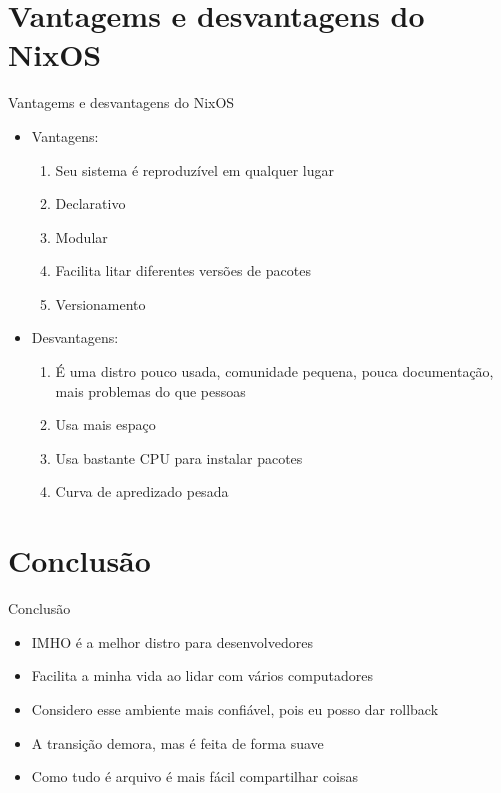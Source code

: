 \documentclass[presentation]{beamer}
\begin{document}
\section{Vantagems e desvantagens do NixOS}
\label{sec:orga81393d}
\begin{frame}[label={sec:org8da6f29}]{Vantagems e desvantagens do NixOS}
\begin{itemize}
\item Vantagens:
\begin{enumerate}
\item Seu sistema é reproduzível em qualquer lugar
\item Declarativo
\item Modular
\item Facilita litar diferentes versões de pacotes
\item Versionamento
\end{enumerate}
\item Desvantagens:
\begin{enumerate}
\item É uma distro pouco usada, comunidade pequena, pouca documentação, mais problemas do que pessoas
\item Usa mais espaço
\item Usa bastante CPU para instalar pacotes
\item Curva de apredizado pesada
\end{enumerate}
\end{itemize}
\end{frame}

\section{Conclusão}
\label{sec:org1348505}
\begin{frame}[label={sec:orgffffbc7}]{Conclusão}
\begin{itemize}
\item IMHO é a melhor distro para desenvolvedores
\item Facilita a minha vida ao lidar com vários computadores
\item Considero esse ambiente mais confiável, pois eu posso dar rollback
\item A transição demora, mas é feita de forma suave
\item Como tudo é arquivo é mais fácil compartilhar coisas
\end{itemize}
\end{frame}
\end{document}
